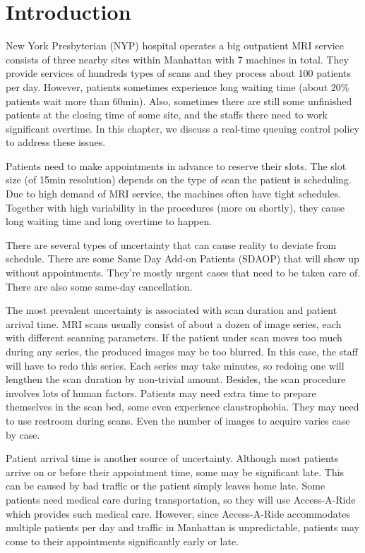 \section{Introduction}

New York Presbyterian (NYP) hospital operates a big outpatient MRI service
consists of three nearby sites within Manhattan with 7 machines in total.
They provide services of hundreds types of scans and they process about 100
patients per day. However, patients sometimes experience long waiting time
(about 20\% patients wait more than 60min). Also, sometimes there are
still some unfinished patients at the closing time of some site,
and the staffs there need to work significant overtime. In this chapter,
we discuss a real-time queuing control policy to address these issues.

Patients need to make appointments in advance to reserve their slots.
The slot size (of 15min resolution) depends on the type of scan the patient is scheduling.
Due to high demand of MRI service, the machines often have tight
schedules. Together with high variability in the procedures (more on
shortly), they cause long waiting time and long overtime to happen.

There are several types of uncertainty that can cause reality to
deviate from schedule. There are some Same Day Add-on Patients (SDAOP)
that will show up without appointments. They're mostly urgent cases
that need to be taken care of. There are also some same-day cancellation.

The most prevalent uncertainty is associated with scan duration and
patient arrival time. MRI scans usually consist of about a dozen of
image series, each with different scanning parameters. If the patient
under scan moves too much during any series, the produced images
may be too blurred. In this case, the staff will have to redo this series.
Each series may take minutes, so redoing one will lengthen the scan
duration by non-trivial amount. Besides, the scan procedure involves
lots of human factors. Patients may need extra time to prepare themselves
in the scan bed, some even experience claustrophobia. They may need to
use restroom during scans. Even the number of images to acquire varies
case by case.

Patient arrival time is another source of uncertainty. Although most
patients arrive on or before their appointment time, some may be
significant late. This can be caused by bad traffic or the patient
simply leaves home late. Some patients need medical care during
transportation, so they will use Access-A-Ride which provides
such medical care. However, since Access-A-Ride accommodates
multiple patients per day and traffic in Manhattan is unpredictable,
patients may come to their appointments significantly early or late.


